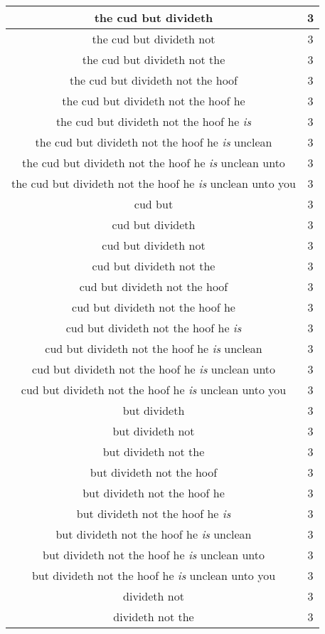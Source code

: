 \begin{center}
\begin{longtable}{|c|c|}
the cud but divideth & 3\\ \hline 
the cud but divideth not & 3\\ \hline 
the cud but divideth not the & 3\\ \hline 
the cud but divideth not the hoof & 3\\ \hline 
the cud but divideth not the hoof he & 3\\ \hline 
the cud but divideth not the hoof he \emph{is} & 3\\ \hline 
the cud but divideth not the hoof he \emph{is} unclean & 3\\ \hline 
the cud but divideth not the hoof he \emph{is} unclean unto & 3\\ \hline 
the cud but divideth not the hoof he \emph{is} unclean unto you & 3\\ \hline 
cud but & 3\\ \hline 
cud but divideth & 3\\ \hline 
cud but divideth not & 3\\ \hline 
cud but divideth not the & 3\\ \hline 
cud but divideth not the hoof & 3\\ \hline 
cud but divideth not the hoof he & 3\\ \hline 
cud but divideth not the hoof he \emph{is} & 3\\ \hline 
cud but divideth not the hoof he \emph{is} unclean & 3\\ \hline 
cud but divideth not the hoof he \emph{is} unclean unto & 3\\ \hline 
cud but divideth not the hoof he \emph{is} unclean unto you & 3\\ \hline 
but divideth & 3\\ \hline 
but divideth not & 3\\ \hline 
but divideth not the & 3\\ \hline 
but divideth not the hoof & 3\\ \hline 
but divideth not the hoof he & 3\\ \hline 
but divideth not the hoof he \emph{is} & 3\\ \hline 
but divideth not the hoof he \emph{is} unclean & 3\\ \hline 
but divideth not the hoof he \emph{is} unclean unto & 3\\ \hline 
but divideth not the hoof he \emph{is} unclean unto you & 3\\ \hline 
divideth not & 3\\ \hline 
divideth not the & 3\\ \hline 

\end{longtable}
\end{center}

